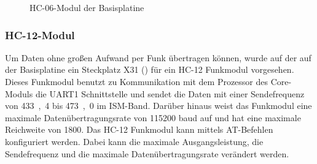 \begin{figure}[H]
    \centering
    \qquad
    \qquad
    \caption[HC-06-Modul der Basisplatine]{HC-06-Modul der \gls{Basisplatine}}
    \label{fig:basisplatine-hc06}
\end{figure}

\subsubsection{HC-12-Modul \cite{basis:hc12}}
Um Daten ohne großen Aufwand per Funk übertragen können, wurde auf der auf der \gls{Basisplatine} ein Steckplatz X31 () für ein HC-12 Funkmodul vorgesehen. Dieses Funkmodul benutzt zu Kommunikation mit dem Prozessor des \gls{Core-Modul}s die UART1 Schnittstelle und sendet die Daten mit einer Sendefrequenz von \unit{433,4}{\mega\hertz} bis \unit{473,0}{\mega\hertz} im ISM-Band. Darüber hinaus weist das Funkmodul eine maximale Datenübertragungsrate von 115200 baud auf und hat eine maximale Reichweite von \unit{1800}{\metre}. Das HC-12 Funkmodul kann mittels AT-Befehlen konfiguriert werden. Dabei kann die maximale Ausgangsleistung, die Sendefrequenz und die maximale Datenübertragungsrate verändert werden.


